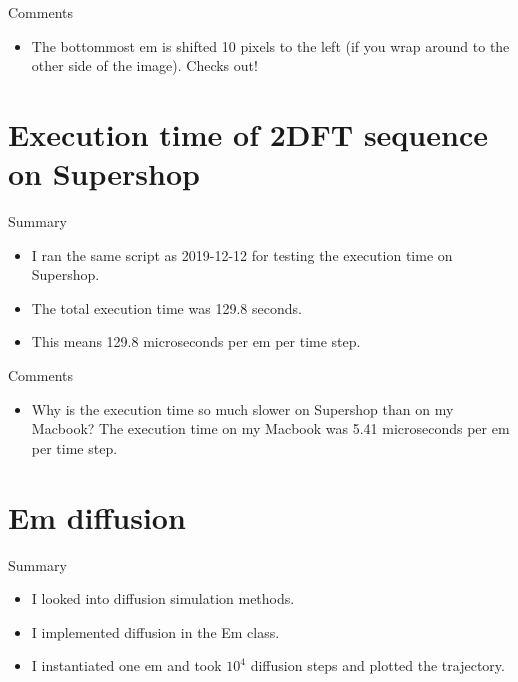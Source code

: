 \documentclass[dvipsnames]{beamer}
\begin{document}
\begin{frame}{Comments}
\begin{itemize}
\item The bottommost em is shifted 10 pixels to the left (if you wrap around to the other side of the image). Checks out!
\end{itemize}
\end{frame}

\section{Execution time of 2DFT sequence on Supershop}

\begin{frame}{Summary}
\begin{itemize}
\item I ran the same script as 2019-12-12 for testing the execution time on Supershop.
\item The total execution time was 129.8 seconds.
\item This means 129.8 microseconds per em per time step.
\end{itemize}
\end{frame}

\begin{frame}{Comments}
\begin{itemize}
\item Why is the execution time so much slower on Supershop than on my Macbook? The execution time on my Macbook was 5.41 microseconds per em per time step.
\end{itemize}
\end{frame}

\section{Em diffusion}

\begin{frame}{Summary}
\begin{itemize}
\item I looked into diffusion simulation methods.
\item I implemented diffusion in the Em class.
\item I instantiated one em and took $10^4$ diffusion steps and plotted the trajectory.
\end{itemize}
\end{frame}
\end{document}
